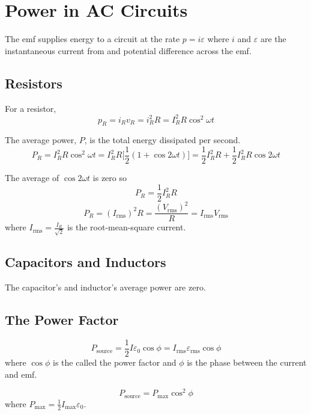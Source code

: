 \documentclass{article}
\begin{document}
\section*{Power in AC Circuits}
The emf supplies energy to a circuit at the rate $p=i\varepsilon$ where $i$ and $\varepsilon$ are
the instantaneous current from and potential difference across the emf.

\subsection*{Resistors}
For a resistor,
\[p_R = i_R v_R = i_R^2 R = I_R^2 R \cos^2 \omega t\]

The average power, $P$, is the total energy dissipated per second.
\[P_R = I_R^2 R \cos^2 \omega t = I_R^2 R \Big[\frac{1}{2}(1 + \cos 2\omega t)\Big] = \frac{1}{2}
I_R^2 R + \frac{1}{2}I_R^2 R \cos 2\omega t\]

The average of $\cos 2\omega t$ is zero so
\[P_R = \frac{1}{2} I_R^2 R\]
\[P_R = {(I_\text{rms})}^2 R = \frac{{(V_\text{rms})}^2}{R} = I_\text{rms}V_\text{rms}\]
where $I_\text{rms} = \frac{I_R}{\sqrt{2}}$ is the root-mean-square current.

\subsection*{Capacitors and Inductors}
The capacitor's and inductor's average power are zero.

\subsection*{The Power Factor}
\[P_\text{source} =  \frac{1}{2} I \varepsilon_0 \cos\phi = I_\text{rms}\varepsilon_\text{rms}\cos
\phi\]
where $\cos\phi$ is the called the power factor and $\phi$ is the phase between the current and
emf.

\[P_\text{source} = P_\text{max}\cos^2 \phi\]
where $P_\text{max} = \frac{1}{2} I_\text{max} \varepsilon_0$.
\end{document}
